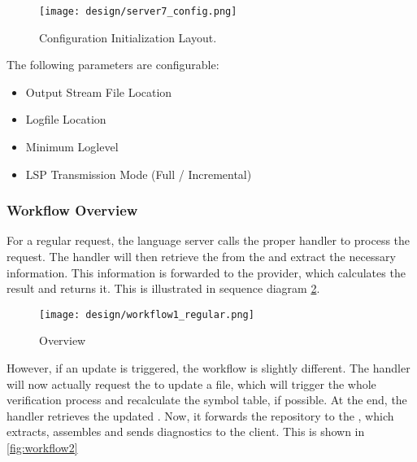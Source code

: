 \begin{figure}[h]
    \centering
    \texttt{[image: design/server7\_config.png]}
    \caption{Configuration Initialization Layout.}
    \label{fig:server_config}
\end{figure}

The following parameters are configurable:
\begin{itemize}
    \item Output Stream File Location
    \item Logfile Location
    \item Minimum Loglevel
    \item LSP Transmission Mode (Full / Incremental)
\end{itemize}


\subsubsection{Workflow Overview}
For a regular request, the language server calls the proper handler to process the request.
The handler will then retrieve the  from the  and extract the necessary information.
This information is forwarded to the provider, which calculates the result and returns it.
This is illustrated in sequence diagram \ref{fig:workflow1}.

\begin{figure}[H]
    \centering
    \texttt{[image: design/workflow1\_regular.png]}
    \caption{Overview}
    \label{fig:workflow1}
\end{figure}


However, if an update is triggered, the workflow is slightly different.
The handler will now actually request the  to update a file, which will trigger the whole verification process and recalculate the symbol table, if possible.
At the end, the handler retrieves the updated .
Now, it forwards the repository to the , which extracts, assembles and sends diagnostics to the client.
This is shown in \ref{fig:workflow2}

